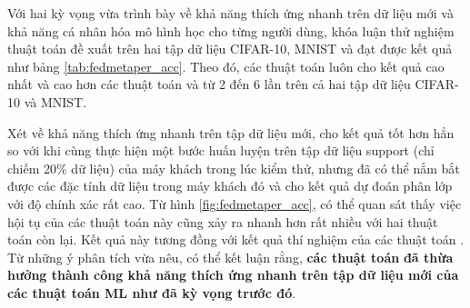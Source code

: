 Với hai kỳ vọng vừa trình bày về khả năng thích ứng nhanh trên dữ liệu mới và khả năng cá nhân hóa mô hình học cho từng người dùng, khóa luận thử nghiệm thuật toán đề xuất trên hai tập dữ liệu CIFAR-10, MNIST và đạt được kết quả như bảng \ref{tab:fedmetaper_acc}. Theo đó, các thuật toán  luôn cho kết quả cao nhất và cao hơn các thuật toán  và  từ 2 đến 6 lần trên cả hai tập dữ liệu CIFAR-10 và MNIST.

\begin{table}[H]
    \centering
    \caption{Bảng độ chính xác (\%) của thuật toán FedPer và các thuật toán FedMeta-Per tính trên điểm dữ liệu (dữ liệu Non-IID)}
    \label{tab:fedmetaper_acc}
\end{table}

Xét về khả năng thích ứng nhanh trên tập dữ liệu mới,  cho kết quả tốt hơn hẳn so với  khi cùng thực hiện một bước huấn luyện trên tập dữ liệu support (chỉ chiếm 20\% dữ liệu) của máy khách trong lúc kiểm thử, nhưng đã có thể nắm bắt được các đặc tính dữ liệu trong máy khách đó và cho kết quả dự đoán phân lớp với độ chính xác rất cao. Từ hình \ref{fig:fedmetaper_acc}, có thể quan sát thấy việc hội tụ của các thuật toán này cũng xảy ra nhanh hơn rất nhiều với hai thuật toán còn lại. Kết quả này tương đồng với kết quả thí nghiệm của các thuật toán . Từ những ý phân tích vừa nêu, có thể kết luận rằng, \textbf{các thuật toán}  \textbf{đã thừa hưởng thành công khả năng thích ứng nhanh trên tập dữ liệu mới của các thuật toán ML như đã kỳ vọng trước đó}.

